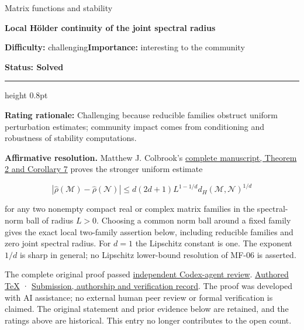 \documentclass[11pt,a4paper]{article}
\makeatletter
\renewcommand{\subsection}{\Needspace{4\baselineskip}\@startsection{subsection}{2}{0pt}{9pt plus 1pt minus 1pt}{3pt}{\sffamily\bfseries\normalsize\color{ink}}}
\makeatother
\begin{document}
{\sffamily\small\color{muted}Matrix functions and stability\par}
\vspace{3pt}
{\raggedright{}\sffamily\bfseries\fontsize{21}{24}\selectfont\color{ink}Local
Hölder continuity of the joint spectral radius\par}
\vspace{7pt}
{\sffamily\small\textbf{Difficulty:} challenging\quad\textbf{Importance:} interesting
to the community\par}
{\sffamily\small\bfseries\color{accent}Status: Solved\par}
\vspace{4pt}
{\color{accent}\hrule height 0.8pt}
\vspace{6pt}
\textbf{Rating rationale:} Challenging because reducible families
obstruct uniform perturbation estimates; community impact comes from
conditioning and robustness of stability computations.

\subsection{Resolution --- 2026-09-11}\label{resolution-2026-09-11}

\textbf{Affirmative resolution.} Matthew J. Colbrook's
\href{https://github.com/ajt60gaibb/OpenProblemsInNLA/blob/main/references/colbrook-jsr-growth-2026-09-11/manuscripts/uniform_growth_and_holder.pdf}{complete
manuscript, Theorem 2 and Corollary 7} proves the stronger uniform
estimate

\[
|\widehat\rho(\mathcal M)-\widehat\rho(\mathcal N)|
\le d(2d+1)L^{1-1/d}d_H(\mathcal M,\mathcal N)^{1/d}
\]

for any two nonempty compact real or complex matrix families in the
spectral-norm ball of radius \(L>0\). Choosing a common norm ball around
a fixed family gives the exact local two-family assertion below,
including reducible families and zero joint spectral radius. For \(d=1\)
the Lipschitz constant is one. The exponent \(1/d\) is sharp in general;
no Lipschitz lower-bound resolution of MF-06 is asserted.

The complete original proof passed
\href{https://github.com/ajt60gaibb/OpenProblemsInNLA/blob/main/references/colbrook-jsr-growth-2026-09-11/verification/reviews/MF-05-MF-07-review.md}{independent
Codex-agent review}.
\href{https://github.com/ajt60gaibb/OpenProblemsInNLA/blob/main/references/colbrook-jsr-growth-2026-09-11/manuscripts/uniform_growth_and_holder.tex}{Authored
TeX} ·
\href{https://github.com/ajt60gaibb/OpenProblemsInNLA/blob/main/references/colbrook-jsr-growth-2026-09-11/README.md}{Submission,
authorship and verification record}. The proof was developed with AI
assistance; no external human peer review or formal verification is
claimed. The original statement and prior evidence below are retained,
and the ratings above are historical. This entry no longer contributes
to the open count.
\end{document}
